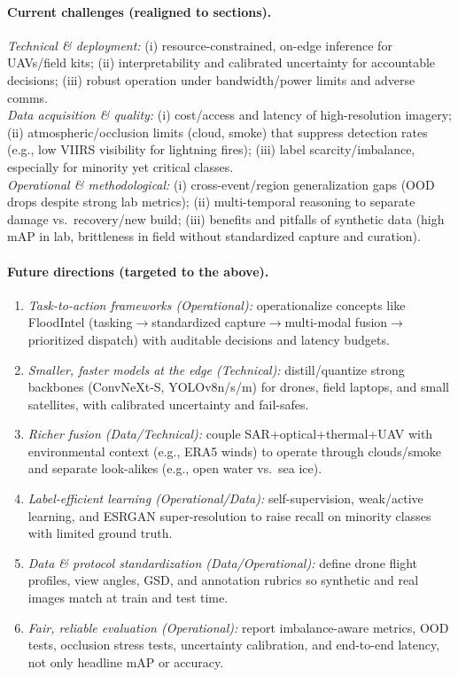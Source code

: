 \documentclass[conference,a4paper]{IEEEtran}
\begin{document}
\paragraph{Current challenges (realigned to sections).}
\textit{Technical \& deployment:} (i) resource-constrained, on-edge inference for UAVs/field kits; (ii) interpretability and calibrated uncertainty for accountable decisions; (iii) robust operation under bandwidth/power limits and adverse comms.\\
\textit{Data acquisition \& quality:} (i) cost/access and latency of high-resolution imagery; (ii) atmospheric/occlusion limits (cloud, smoke) that suppress detection rates (e.g., low VIIRS visibility for lightning fires); (iii) label scarcity/imbalance, especially for minority yet critical classes.\\
\textit{Operational \& methodological:} (i) cross-event/region generalization gaps (OOD drops despite strong lab metrics); (ii) multi-temporal reasoning to separate damage vs.\ recovery/new build; (iii) benefits and pitfalls of synthetic data (high mAP in lab, brittleness in field without standardized capture and curation).

\paragraph{Future directions (targeted to the above).}
\begin{enumerate}
  \item \textit{Task-to-action frameworks (Operational):} operationalize concepts like FloodIntel (tasking$\rightarrow$standardized capture$\rightarrow$multi-modal fusion$\rightarrow$prioritized dispatch) with auditable decisions and latency budgets.
  \item \textit{Smaller, faster models at the edge (Technical):} distill/quantize strong backbones (ConvNeXt-S, YOLOv8n/s/m) for drones, field laptops, and small satellites, with calibrated uncertainty and fail-safes.
  \item \textit{Richer fusion (Data/Technical):} couple SAR+optical+thermal+UAV with environmental context (e.g., ERA5 winds) to operate through clouds/smoke and separate look-alikes (e.g., open water vs.\ sea ice).
  \item \textit{Label-efficient learning (Operational/Data):} self-supervision, weak/active learning, and ESRGAN super-resolution to raise recall on minority classes with limited ground truth.
  \item \textit{Data \& protocol standardization (Data/Operational):} define drone flight profiles, view angles, GSD, and annotation rubrics so synthetic and real images match at train and test time.
  \item \textit{Fair, reliable evaluation (Operational):} report imbalance-aware metrics, OOD tests, occlusion stress tests, uncertainty calibration, and end-to-end latency, not only headline mAP or accuracy.
\end{enumerate}
\end{document}
